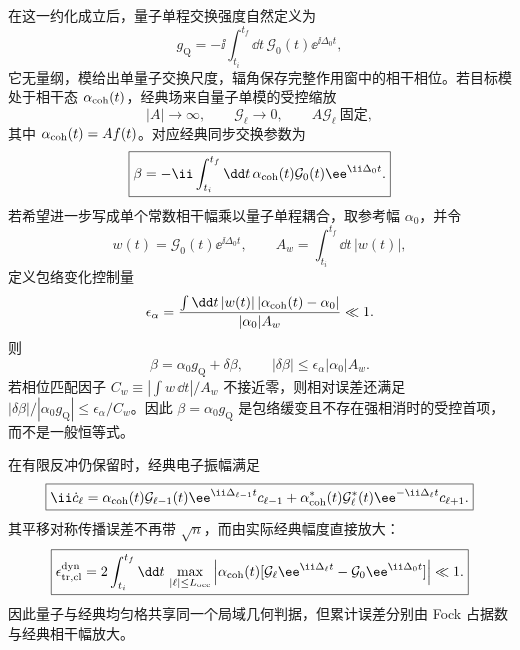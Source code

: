 在这一约化成立后，量子单程交换强度自然定义为
\begin{equation}
\boxed{
g_{\mathrm Q}=-\ii\int_{t_i}^{t_f}\dd t\,\mathcal G_0(t)\ee^{\ii\Delta_0t},}
\label{eq:single_pass_quantum_coupling_general}
\end{equation}
它无量纲，模给出单量子交换尺度，辐角保存完整作用窗中的相干相位。若目标模处于相干态 $\alpha_{\rm coh}(t)$，经典场来自量子单模的受控缩放
\begin{equation}
\boxed{
|A|\to\infty,
\qquad \mathcal G_\ell\to0,
\qquad A\mathcal G_\ell\ \text{固定},}
\label{eq:coherent_classical_limit}
\end{equation}
其中 $\alpha_{\rm coh}(t)=Af(t)$。对应经典同步交换参数为
\begin{equation}
\boxed{
\beta=-\ii\int_{t_i}^{t_f}\dd t\,
\alpha_{\rm coh}(t)\mathcal G_0(t)\ee^{\ii\Delta_0t}.}
\label{eq:classical_synchronous_coupling_from_quantum}
\end{equation}
若希望进一步写成单个常数相干幅乘以量子单程耦合，取参考幅 $\alpha_0$，并令
\begin{equation*}
 w(t)=\mathcal G_0(t)\ee^{\ii\Delta_0t},
 \qquad
 A_w=\int_{t_i}^{t_f}\dd t\,|w(t)|,
\end{equation*}
定义包络变化控制量
\begin{equation*}
 \epsilon_\alpha
 =\frac{\int\dd t\,|w(t)|\,|\alpha_{\rm coh}(t)-\alpha_0|}
 {|\alpha_0|A_w}\ll1.
\end{equation*}
则
\begin{equation*}
 \beta=\alpha_0g_{\mathrm Q}+\delta\beta,
 \qquad
 |\delta\beta|\le\epsilon_\alpha|\alpha_0|A_w.
\end{equation*}
若相位匹配因子 $C_w\equiv|\int w\,\dd t|/A_w$ 不接近零，则相对误差还满足 $|\delta\beta|/|\alpha_0g_{\mathrm Q}|\le\epsilon_\alpha/C_w$。因此 $\beta=\alpha_0g_{\mathrm Q}$ 是包络缓变且不存在强相消时的受控首项，而不是一般恒等式。

在有限反冲仍保留时，经典电子振幅满足
\begin{equation}
\boxed{
\ii\dot c_\ell
=\alpha_{\rm coh}(t)\mathcal G_{\ell-1}(t)\ee^{\ii\Delta_{\ell-1}t}c_{\ell-1}
+\alpha_{\rm coh}^*(t)\mathcal G_\ell^*(t)\ee^{-\ii\Delta_\ell t}c_{\ell+1}.}
\label{eq:classical_recoil_chain_from_master}
\end{equation}
其平移对称传播误差不再带 $\sqrt n$，而由实际经典幅度直接放大：
\begin{equation}
\boxed{
\epsilon_{\rm tr,cl}^{\rm dyn}
=2\int_{t_i}^{t_f}\dd t\,
\max_{|\ell|\le L_{\rm occ}}
\left|\alpha_{\rm coh}(t)
[\mathcal G_\ell\ee^{\ii\Delta_\ell t}-\mathcal G_0\ee^{\ii\Delta_0t}]
\right|\ll1.}
\label{eq:classical_translation_duhamel_error}
\end{equation}
因此量子与经典均匀格共享同一个局域几何判据，但累计误差分别由 Fock 占据数与经典相干幅放大。

